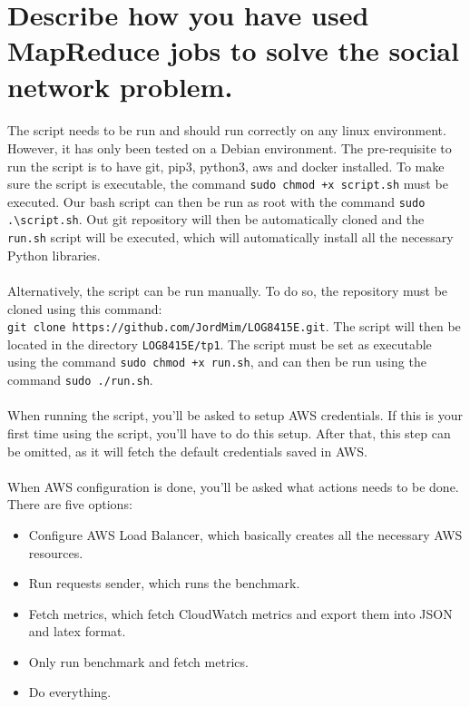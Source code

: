 \pagebreak
\section{Describe how you have used MapReduce jobs to solve the social network problem.} \label{T4}

\paragraph{}The script needs to be run and should run correctly on any linux environment. However, it has only been tested on a Debian environment. The pre-requisite to run the script is to have git, pip3, python3, aws and docker installed. To make sure the script is executable, the command \verb|sudo chmod +x script.sh| must be executed. Our bash script can then be run as root with the command \verb|sudo .\script.sh|. Out git repository will then be automatically cloned and the \verb|run.sh| script will be executed, which will automatically install all the necessary Python libraries.

\paragraph{}Alternatively, the script can be run manually. To do so, the repository must be cloned using this command:\\\verb|git clone https://github.com/JordMim/LOG8415E.git|. The script will then be located in the directory \verb|LOG8415E/tp1|. The script must be set as executable using the command \verb|sudo chmod +x run.sh|, and can then be run using the command \verb|sudo ./run.sh|.

\paragraph{}When running the script, you'll be asked to setup AWS credentials. If this is your first time using the script, you'll have to do this setup. After that, this step can be omitted, as it will fetch the default credentials saved in AWS.\\




\paragraph{}When AWS configuration is done, you'll be asked what actions needs to be done. There are five options:
\begin{itemize}
  \item Configure AWS Load Balancer, which basically creates all the necessary AWS resources.
  \item Run requests sender, which runs the benchmark.
  \item Fetch metrics, which fetch CloudWatch metrics and export them into JSON and latex format.
  \item Only run benchmark and fetch metrics.
  \item Do everything.
\end{itemize}





